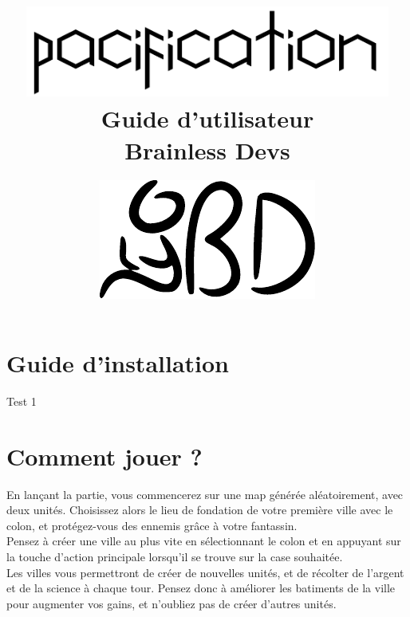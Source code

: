 \documentclass[a5paper, 10pt, twoside]{article}
\begin{document}
\title{
	{\vspace{3em}\protect\centering\protect\includegraphics[width=0.9\textwidth]{Pacification_logo}}\\
    {\vspace{4em}\Huge Guide d'utilisateur}\\
	{\large Brainless Devs}
}
\date{
	{\vfill\protect\centering\protect\includegraphics{brainless_devs.pdf}}\\
}
\maketitle
\cleardoublepage

\section*{Guide d'installation}

Test 1

\newpage
\section*{Comment jouer ?}

En lançant la partie, vous commencerez sur une map générée aléatoirement, avec
deux unités. Choisissez alors le lieu de fondation de votre première ville avec
le colon, et protégez-vous des ennemis grâce à votre fantassin.\\

Pensez à créer une ville au plus vite en sélectionnant le colon et en appuyant
sur la touche d'action principale lorsqu'il se trouve sur la case souhaitée.\\

Les villes vous permettront de créer de nouvelles unités, et de récolter de
l'argent et de la science à chaque tour. Pensez donc à améliorer les batiments
de la ville pour augmenter vos gains, et n'oubliez pas de créer d'autres
unités.\\
\end{document}
